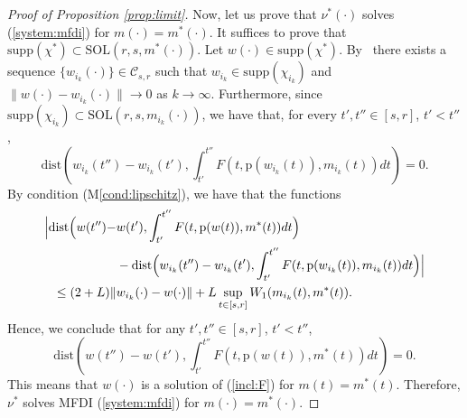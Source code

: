 \documentclass[a4paper,12pt]{article}
\begin{document}
\begin{proof}[Proof of Proposition \ref{prop:limit}]
	Now, let us prove that $\nu^*(\cdot)$ solves (\ref{system:mfdi}) for $m(\cdot)=m^*(\cdot)$. It suffices to prove that $\mathrm{supp}(\chi^*)\subset\mathrm{SOL}(r,s,m^*(\cdot))$. Let $w(\cdot)\in\mathrm{supp}(\chi^*)$. By~\cite[Proposition 5.1.8]{Ambrosio} there exists a sequence $\{w_{i_k}(\cdot)\}\in\mathcal{C}_{s,r}$ such that $w_{i_k}\in\mathrm{supp}(\chi_{i_k})$ and $\|w(\cdot)-w_{i_k}(\cdot)\|\rightarrow 0$ as $k\rightarrow \infty$. Furthermore, since $\mathrm{supp}(\chi_{i_k})\subset\mathrm{SOL}(r,s,m_{i_k}(\cdot))$, we have that, for every $t',t''\in [s,r]$, $t'<t''$,
	$$\mathrm{dist}\left(w_{i_k}(t'')-w_{i_k}(t'),\int_{t'}^{t''}F(t,\mathrm{p}(w_{i_k}(t)),m_{i_k}(t))dt\right) =0.$$ By condition (M\ref{cond:lipschitz}), we have that the functions 
	\begin{equation*}
	\begin{split}
	\Bigl|\mathrm{dist}\Bigl(w(t'')-&w(t'),\int_{t'}^{t''}F(t,\mathrm{p}(w(t)),m^*(t))dt\Bigr)\\
	&-\mathrm{dist}\Bigl(w_{i_k}(t'')-w_{i_k}(t'), \int_{t'}^{t''}F(t,\mathrm{p}(w_{i_k}(t)),m_{i_k}(t))dt\Bigr)\Bigr|\\\leq
	(2+L)\|&w_{i_k}(\cdot)-w(\cdot)\|+L\sup_{t\in [s,r]}W_1(m_{i_k}(t),m^*(t)).
	\end{split} 
	\end{equation*}	Hence, we conclude that for any $t',t''\in [s,r]$, $t'<t''$,
	$$\mathrm{dist}\left(w(t'')-w(t'),\int_{t'}^{t''}F(t,\mathrm{p}(w(t)),m^*(t))dt\right) =0.$$
	This means that $w(\cdot)$ is a solution of (\ref{incl:F}) for $m(t)=m^*(t)$. Therefore, $\nu^*$ solves MFDI (\ref{system:mfdi}) for $m(\cdot)=m^*(\cdot)$.
\end{proof}
\end{document}
